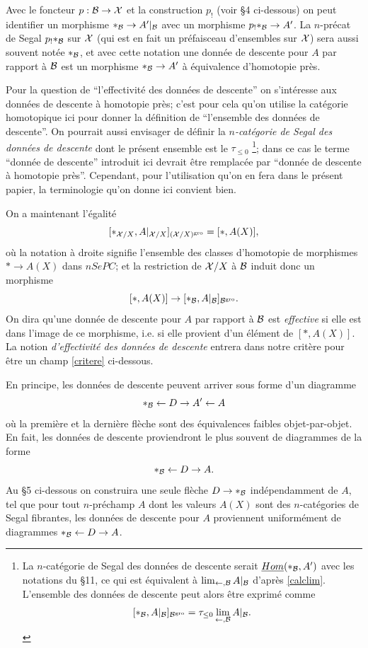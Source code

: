 \documentclass[12pt]{article}
\newcommand{\Bb}{{\cal B}}
\newcommand{\Xx}{{\cal X}}
\begin{document}
Avec le foncteur $p: \Bb \rightarrow \Xx$ et la construction $p_!$ (voir \S 4
ci-dessous) on peut identifier un morphisme
$\ast _{\Bb}\rightarrow A'|_{\Bb}$ avec un morphisme
$p_!\ast _{\Bb}\rightarrow A'$. La $n$-pr\'ecat de Segal $p_!\ast
_{\Bb}$
sur $\Xx$ (qui est en fait un pr\'efaisceau d'ensembles sur $\Xx$) sera
aussi souvent
not\'ee
$\ast _{\Bb}$, et avec cette notation une donn\'ee de descente pour $A$ par
rapport \`a $\Bb$ est un morphisme  $\ast _{\Bb} \rightarrow A'$ \`a
\'equivalence d'homotopie pr\`es.




Pour la question de ``l'effectivit\'e des donn\'ees de descente'' on
s'int\'eresse
aux donn\'ees de descente \`a homotopie pr\`es; c'est pour cela qu'on utilise
la cat\'egorie homotopique ici pour donner la d\'efinition de
``l'ensemble des donn\'ees de descente''. On pourrait aussi
envisager de d\'efinir la {\em $n$-cat\'egorie de Segal des donn\'ees de
descente}
dont le pr\'esent ensemble est le
$\tau _{\leq 0}$
%
%
\footnote{
La $n$-cat\'egorie de Segal des donn\'ees de
descente serait $\underline{Hom}(\ast _{\Bb}, A')$ avec les
notations du \S 11, ce qui est \'equivalent
\`a  $\lim _{\leftarrow , \Bb}
A|_{\Bb}$ d'apr\`es \ref{calclim}.
L'ensemble des donn\'ees de descente
peut alors \^etre exprim\'e comme
$$
[\ast _{\Bb},A|_{\Bb}]_{\Bb ^{\rm gro}}=\tau _{\leq 0} \lim _{\leftarrow , \Bb}
A|_{\Bb}.
$$};
%
%
dans ce cas le terme ``donn\'ee de descente''
introduit ici devrait \^etre remplac\'ee par ``donn\'ee de descente \`a
homotopie pr\`es''. Cependant, pour l'utilisation qu'on en fera
dans le pr\'esent papier, la terminologie qu'on donne ici convient
bien.

On a maintenant l'\'egalit\'e
$$
[\ast _{\Xx /X},A|_{\Xx /X}]_{(\Xx /X) ^{\rm gro}}
= [\ast , A(X)],
$$
o\`u la notation \`a droite signifie l'ensemble des classes d'homotopie de
morphismes $\ast
\rightarrow A(X)$ dans $nSePC$; et la restriction de $\Xx /X$ \`a $\Bb$
induit donc un morphisme
$$
[\ast , A(X)]\rightarrow
[\ast _{\Bb},A|_{\Bb}]_{\Bb ^{\rm gro}}.
$$
On dira qu'une donn\'ee de descente pour $A$ par rapport \`a $\Bb$
est {\em effective} si elle est dans l'image de ce morphisme, i.e. si elle
provient d'un \'el\'ement de $[\ast , A(X)]$.
La notion {\em d'effectivit\'e des donn\'ees de descente} entrera dans notre
crit\`ere pour \^etre un champ \ref{critere} ci-dessous.

En principe, les donn\'ees de descente peuvent arriver sous forme d'un diagramme
$$
\ast _{\Bb} \leftarrow D \rightarrow A'\leftarrow A
$$
o\`u la premi\`ere et la derni\`ere fl\`eche sont des \'equivalences faibles
objet-par-objet. En fait,  les donn\'ees de descente proviendront le plus
souvent de diagrammes de la forme
$$
\ast _{\Bb} \leftarrow D \rightarrow A.
$$
Au \S 5 ci-dessous on construira une seule fl\`eche $D\rightarrow \ast
_{\Bb}$ ind\'ependamment de $A$, tel que pour tout $n$-pr\'echamp $A$ dont les
valeurs $A(X)$ sont des $n$-cat\'egories de Segal fibrantes, les donn\'ees de
descente pour $A$ proviennent uniform\'ement de diagrammes
$\ast _{\Bb} \leftarrow D \rightarrow
A$.
\end{document}
